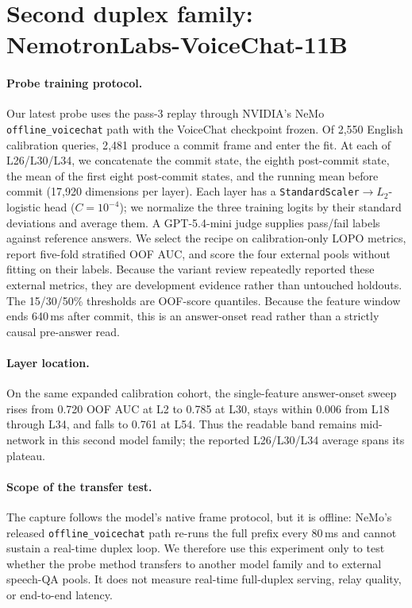 \section{Second duplex family: NemotronLabs-VoiceChat-11B}
\label{app:nvda}

\paragraph{Probe training protocol.}
Our latest probe uses the pass-3 replay through NVIDIA's NeMo
\texttt{offline\_voicechat} path with the VoiceChat checkpoint frozen.
Of 2{,}550 English calibration queries, 2{,}481 produce a commit frame
and enter the fit. At each of L26/L30/L34, we concatenate the commit
state, the eighth post-commit state, the mean of the first eight
post-commit states, and the running mean before commit (17{,}920
dimensions per layer). Each layer has a
\texttt{StandardScaler}$\to L_2$-logistic head ($C{=}10^{-4}$);
we normalize the three training logits by their standard deviations
and average them. A GPT-5.4-mini judge supplies pass/fail labels
against reference answers. We select the recipe on calibration-only
LOPO metrics, report five-fold stratified OOF AUC, and score the four
external pools without fitting on their labels. Because the variant
review repeatedly reported these external metrics, they are
development evidence rather than untouched holdouts. The 15/30/50\%
thresholds are OOF-score quantiles. Because the feature window ends
640\,ms after commit, this is an answer-onset read rather than a
strictly causal pre-answer read.

\paragraph{Layer location.}
On the same expanded calibration cohort, the single-feature
answer-onset sweep rises from 0.720 OOF AUC at L2 to 0.785 at L30,
stays within 0.006 from L18 through L34, and falls to 0.761 at L54.
Thus the readable band remains mid-network in this second model
family; the reported L26/L30/L34 average spans its plateau.

\paragraph{Scope of the transfer test.}
The capture follows the model's native frame protocol, but it is
offline: NeMo's released \texttt{offline\_voicechat} path re-runs the
full prefix every 80\,ms and cannot sustain a real-time duplex loop.
We therefore use this experiment only to test whether the probe
method transfers to another model family and to external speech-QA pools.
It does not measure real-time full-duplex serving, relay quality, or
end-to-end latency.


